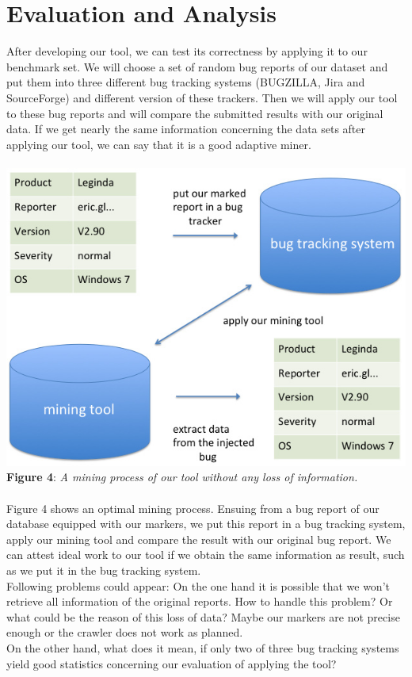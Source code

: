 \chapter{Evaluation and Analysis}
\label{Evaluation and Analysis}
After developing our tool, we can test its correctness by applying it to our benchmark set. We will choose a set of random bug reports of our dataset and put them into three different bug tracking systems (BUGZILLA, Jira and SourceForge) and different version of these trackers. Then we will apply our tool to these bug reports and will compare the submitted results with our original data. If we get nearly the same information concerning the data sets after applying our tool, we can say that it is a good adaptive miner. \\ \\\includegraphics[width=1.0\textwidth]{Folie2.jpg}  \\\textbf{Figure 4}: \textit{A mining process of our tool without any loss of information.}  \\ \\
Figure 4 shows an optimal mining process. Ensuing from a bug report of our database equipped with our markers, we put this report in a bug tracking system, apply our mining tool and compare the result with our original bug report. We can attest ideal work to our tool if we obtain the same information as result, such as we put it in the bug tracking system. \\ Following problems could appear: On the one hand it is possible that we won't retrieve all information of the original reports. How to handle this problem? Or what could be the reason of this loss of data? Maybe our markers are not precise enough or the crawler does not work as planned. \\ On the other hand, what does it mean, if only two of three bug tracking systems yield good statistics concerning our evaluation of applying the tool?
